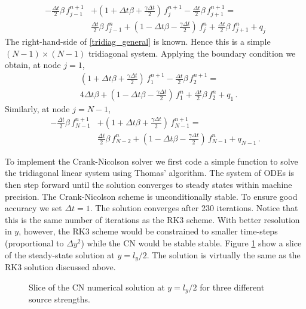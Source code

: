 \documentclass[11pt]{article}
\newcommand{\per}{\, .}
\begin{document}
\begin{enumerate}[label=(\alph*)]
        \begin{align}
            \label{tridiag_general}
            -\tfrac{\Delta t}{2}\beta\,f_{j-1}^{n+1} & + \left(1 + \Delta t \beta + \tfrac{\gamma \Delta t}{2}\right)\,f_j^{n+1} -\tfrac{\Delta t}{2}\beta\,f_{j+1}^{n+1} =   \nonumber \\ &\tfrac{\Delta t}{2}\beta\,f_{j-1}^{n}+\left(1 - \Delta t \beta - \tfrac{\gamma \Delta t}{2}\right)\,f_j^{n} + \tfrac{\Delta t}{2}\beta\,f_{j+1}^{n} + q_j
        \end{align}
        The right-hand-side of \eqref{tridiag_general} is known. Hence this is a simple $(N-1)\times(N-1)$ tridiagonal system. Applying the boundary condition we obtain, at node $j=1$,
        \begin{align}
            \label{tridiag_general_1}
            &  \left(1 + \Delta t \beta + \tfrac{\gamma \Delta t}{2}\right)\,f_1^{n+1} -\tfrac{\Delta t}{2}\beta\,f_{2}^{n+1} =   \nonumber \\ &4\Delta t\beta+\left(1 - \Delta t \beta - \tfrac{\gamma \Delta t}{2}\right)\,f_1^{n} + \tfrac{\Delta t}{2}\beta\,f_{2}^{n} + q_1\per
        \end{align}
        Similarly, at node $j=N-1$,
          \begin{align}
            \label{tridiag_general_N1}
            -\tfrac{\Delta t}{2}\beta\,f_{N-1}^{n+1} & + \left(1 + \Delta t \beta + \tfrac{\gamma \Delta t}{2}\right)\,f_{N-1}^{n+1} =   \nonumber \\ &\tfrac{\Delta t}{2}\beta\,f_{N-2}^{n}+\left(1 - \Delta t \beta - \tfrac{\gamma \Delta t}{2}\right)\,f_{N-1}^{n}+ q_{N-1}\per
        \end{align}


        To implement the Crank-Nicolson solver we first code a simple function to solve the tridiagonal linear system using Thomas' algorithm. The system of ODEs is then step forward until the solution converges to steady states within machine precision. The Crank-Nicolson scheme is unconditionally stable. To ensure good accuracy we set $\Delta t = 1$. The solution converges after 230 iterations. Notice that this is the same number of iterations as the RK3 scheme. With better resolution in $y$, however, the RK3 scheme would be constrained to smaller time-steps (proportional to $\Delta y^2$) while the CN would be stable stable.  Figure \ref{soln_cn} show a slice of the steady-state solution at $y=l_y/2$. The solution is virtually the same as the RK3 solution discussed above.


        \begin{figure}[p]
        \centerline{}
        \caption{Slice of the CN numerical solution at $y=l_y/2$ for three different source strengths.}
        \label{soln_cn}
        \end{figure}


\end{enumerate}

\end{document}
